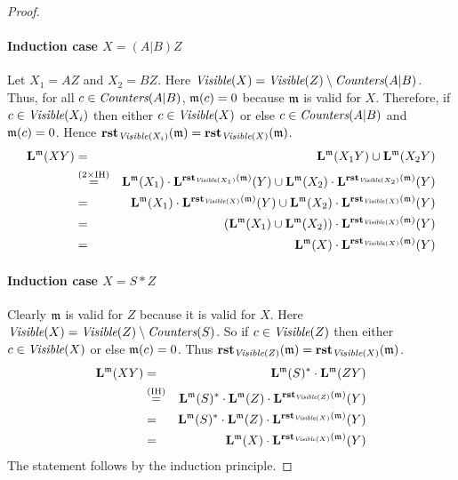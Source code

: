 \begin{proof}
    \paragraph{Induction case $X=(A|B)Z$} Let $X_1=AZ$ and $X_2=BZ$.
    Here $\textit{Visible}(X)=\textit{Visible}(Z)\setminus\textit{Counters}(A|B)$.
    Thus, for all $c\in\textit{Counters}(A|B)$, $\mathfrak{m}(c)=0$ because
    $\mathfrak{m}$ is valid for $X$. Therefore,
    if $c\in\textit{Visible}(X_i)$ then either $c\in\textit{Visible}(X)$ or else
    $c\in\textit{Counters}(A|B)$ and $\mathfrak{m}(c)=0$. Hence
    $\textbf{rst}_{\textit{Visible}(X_i)}(\mathfrak{m}) = \textbf{rst}_{\textit{Visible}(X)}(\mathfrak{m})$.
    \begin{eqnarray*}
      \mathbf{L}^{\mathfrak{m}}(XY) &=& \mathbf{L}^{\mathfrak{m}}(X_1Y) \cup  \mathbf{L}^{\mathfrak{m}}(X_2Y) \\
      &\stackrel{\textrm{($2\times$IH)}}{=}&
      \mathbf{L}^{\mathfrak{m}}(X_1)\cdot\mathbf{L}^{\textbf{rst}_{\textit{Visible}(X_1)}(\mathfrak{m})}(Y)\cup
      \mathbf{L}^{\mathfrak{m}}(X_2)\cdot\mathbf{L}^{\textbf{rst}_{\textit{Visible}(X_2)}(\mathfrak{m})}(Y)\\
      &=&
      \mathbf{L}^{\mathfrak{m}}(X_1)\cdot\mathbf{L}^{\textbf{rst}_{\textit{Visible}(X)}(\mathfrak{m})}(Y)\cup
      \mathbf{L}^{\mathfrak{m}}(X_2)\cdot\mathbf{L}^{\textbf{rst}_{\textit{Visible}(X)}(\mathfrak{m})}(Y)\\
      &=&
      (\mathbf{L}^{\mathfrak{m}}(X_1)\cup
      \mathbf{L}^{\mathfrak{m}}(X_2))\cdot\mathbf{L}^{\textbf{rst}_{\textit{Visible}(X)}(\mathfrak{m})}(Y)\\
    &=&
    \mathbf{L}^{\mathfrak{m}}(X)\cdot\mathbf{L}^{\textbf{rst}_{\textit{Visible}(X)}(\mathfrak{m})}(Y)
    \end{eqnarray*}

    \paragraph{Induction case $X=S{*}Z$}
    Clearly $\mathfrak{m}$ is valid for $Z$ because it is valid for $X$.
    Here $\textit{Visible}(X)=\textit{Visible}(Z)\setminus\textit{Counters}(S)$.
    So if $c\in\textit{Visible}(Z)$ then either $c\in\textit{Visible}(X)$ or else 
    $\mathfrak{m}(c)=0$. Thus
    $\textbf{rst}_{\textit{Visible}(Z)}(\mathfrak{m}) = \textbf{rst}_{\textit{Visible}(X)}(\mathfrak{m})$.
        \begin{eqnarray*}
      \mathbf{L}^{\mathfrak{m}}(XY) &=& \mathbf{L}^{\mathfrak{m}}(S)^* \cdot\mathbf{L}^{\mathfrak{m}}(ZY) \\
      &\stackrel{\textrm{(IH)}}{=}&
      \mathbf{L}^{\mathfrak{m}}(S)^* \cdot
      \mathbf{L}^{\mathfrak{m}}(Z)\cdot\mathbf{L}^{\textbf{rst}_{\textit{Visible}(Z)}(\mathfrak{m})}(Y)
      \\
      &=&
      \mathbf{L}^{\mathfrak{m}}(S)^* \cdot
      \mathbf{L}^{\mathfrak{m}}(Z)\cdot\mathbf{L}^{\textbf{rst}_{\textit{Visible}(X)}(\mathfrak{m})}(Y)
      \\
      &=&
    \mathbf{L}^{\mathfrak{m}}(X)\cdot\mathbf{L}^{\textbf{rst}_{\textit{Visible}(X)}(\mathfrak{m})}(Y)
    \end{eqnarray*}
The statement follows by the induction principle.
\end{proof}

